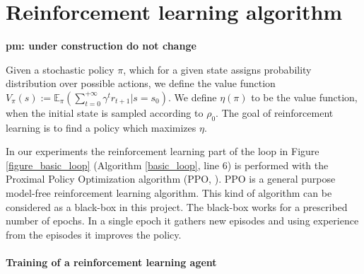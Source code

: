 \section{Reinforcement learning algorithm}
\label{sec:rl}

\textbf{pm: under construction do not change}

Given a stochastic policy $\pi$, which for a given state assigns probability distribution over possible actions, we define the value function $V_\pi(s) := \mathbb{E}_{\pi}\left(\sum_{t=0}^{+\infty}\gamma^t r_{t+1}|s=s_0 \right)$. We define $\eta(\pi)$ to be the value function, when the initial state is sampled according to $\rho_0$. The goal of reinforcement learning is to find a policy which maximizes $\eta$.

In our experiments the reinforcement learning part of the loop in Figure \ref{figure_basic_loop} (Algorithm \ref{basic_loop}, line 6) is performed with the Proximal Policy Optimization algorithm (PPO, \cite{ppo}). PPO is a general purpose model-free reinforcement learning algorithm. This kind of algorithm can be considered as a black-box in this project. The black-box works for a prescribed number of epochs. In a single epoch it gathers new episodes and using experience from the episodes it improves the policy. %

\paragraph{Training of a reinforcement learning agent}
